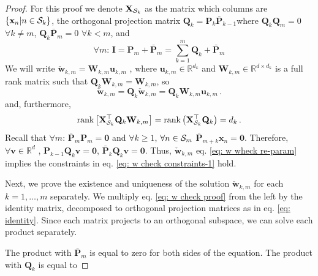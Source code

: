 \documentclass[twoside,11pt,english]{article}
\begin{document}
\begin{proof}
For this proof we denote $\mathbf{X}_{\mathcal{S}_{k}}$ as the matrix which
columns are $\left\{ \mathbf{x}_{n}|n\in\mathcal{S}_{k}\right\} $, the orthogonal
projection matrix $\mathbf{Q}_{k}=\mathbf{P}_{k}\bar{\mathbf{P}}_{k-1}$where
$\mathbf{Q}_{k}\mathbf{Q}_{m}=0$ $\forall k\neq m$, $\mathbf{Q}_{k}\bar{\mathbf{P}}_{m}=0$
$\forall k<m$, and
\begin{equation}
\forall m:\,\mathbf{I}=\mathbf{P}_{m}+\bar{\mathbf{P}}_{m}=\sum_{k=1}^{m}\mathbf{Q}_{k}+\bar{\mathbf{P}}_{m}\label{eq: identity}
\end{equation}
We will write $\check{\mathbf{w}}_{k,m}=\mathbf{W}_{k,m}\mathbf{u}_{k,m}$
, where $\mathbf{u}_{k,m}\in\mathbb{R}^{d_{k}}$ and $\mathbf{W}_{k,m}\in\mathbb{R}^{d\times d_{k}}$
is a full rank matrix such that $\mathbf{Q}_{k}\mathbf{W}_{k,m}=\mathbf{W}_{k,m}$,
so 
\begin{equation}
\check{\mathbf{w}}_{k,m}=\mathbf{Q}_{k}\check{\mathbf{w}}_{k,m}=\mathbf{Q}_{k}\mathbf{W}_{k,m}\mathbf{u}_{k,m}\,.\label{eq: w wheck re-param}
\end{equation}
 and, furthermore,
\begin{equation}
\mathrm{rank}\left[\mathbf{X}_{\mathcal{S}_{k}}^{\top}\mathbf{Q}_{k}\mathbf{W}_{k,m}\right]=\mathrm{rank}\left(\mathbf{X}_{\mathcal{S}_{k}}^{\top}\mathbf{Q}_{k}\right)=d_{k}\,.\label{eq: rank W}
\end{equation}
Recall that $\forall m:\,\mathbf{\bar{P}}_{m}\mathbf{P}_{m}=\boldsymbol{0}$
and $\forall k\geq1$, $\forall n\in\mathcal{S}_{m}$ $\mathbf{\bar{P}}_{m+k}\mathbf{x}_{n}=\boldsymbol{0}$.
Therefore, $\forall\mathbf{v}\in\mathbb{R}^{d}$ , $\mathbf{P}_{k-1}\mathbf{Q}_{k}\mathbf{v}=\boldsymbol{0}$,
$\mathbf{\bar{P}}_{k}\mathbf{Q}_{k}\mathbf{v}=\mathbf{0}$. Thus,
$\check{\mathbf{w}}_{k,m}$ eq. \ref{eq: w wheck re-param} implies
the constraints in eq. \ref{eq: w check constraints-1} hold. 

Next, we prove the existence and uniqueness of the solution $\check{\mathbf{w}}_{k,m}$
for each $k=1,\dots,m$ separately. We multiply eq. \ref{eq: w check proof}
from the left by the identity matrix, decomposed to orthogonal projection
matrices as in eq. \ref{eq: identity}. Since each matrix projects
to an orthogonal subspace, we can solve each product separately. 

The product with $\bar{\mathbf{P}}_{m}$ is equal to zero for both
sides of the equation. The product with $\mathbf{Q}_{k}$ is equal
to


\end{proof}
\end{document}
